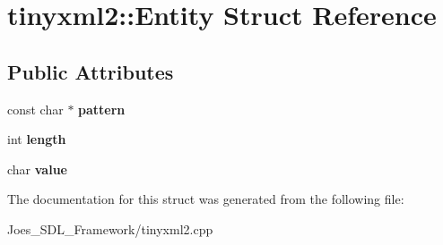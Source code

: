 \hypertarget{structtinyxml2_1_1_entity}{\section{tinyxml2\-:\-:Entity Struct Reference}
\label{structtinyxml2_1_1_entity}
}
\subsection*{Public Attributes}
\begin{DoxyCompactItemize}
\item 
\hypertarget{structtinyxml2_1_1_entity_ab330f5d665d29bfc811ecfa76315894b}{const char $\ast$ {\bfseries pattern}}\label{structtinyxml2_1_1_entity_ab330f5d665d29bfc811ecfa76315894b}

\item 
\hypertarget{structtinyxml2_1_1_entity_a25e2b57cb59cb4fa68f283d7cb570f21}{int {\bfseries length}}\label{structtinyxml2_1_1_entity_a25e2b57cb59cb4fa68f283d7cb570f21}

\item 
\hypertarget{structtinyxml2_1_1_entity_a7334e81e33b4615655a403711b24f3ed}{char {\bfseries value}}\label{structtinyxml2_1_1_entity_a7334e81e33b4615655a403711b24f3ed}

\end{DoxyCompactItemize}


The documentation for this struct was generated from the following file\-:\begin{DoxyCompactItemize}
\item 
Joes\-\_\-\-S\-D\-L\-\_\-\-Framework/tinyxml2.\-cpp\end{DoxyCompactItemize}
